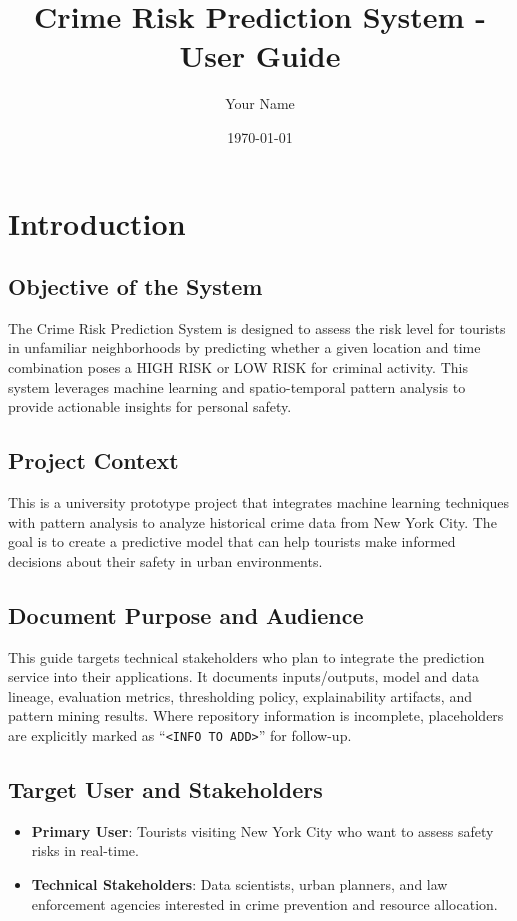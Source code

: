\documentclass{article}
\title{Crime Risk Prediction System - User Guide}
\author{Your Name}
\date{\today}
\begin{document}
\maketitle

\tableofcontents
\newpage

\section{Introduction}

\subsection{Objective of the System}
The Crime Risk Prediction System is designed to assess the risk level for tourists in unfamiliar neighborhoods by predicting whether a given location and time combination poses a HIGH RISK or LOW RISK for criminal activity. This system leverages machine learning and spatio-temporal pattern analysis to provide actionable insights for personal safety.

\subsection{Project Context}
This is a university prototype project that integrates machine learning techniques with pattern analysis to analyze historical crime data from New York City. The goal is to create a predictive model that can help tourists make informed decisions about their safety in urban environments.

\subsection{Document Purpose and Audience}
This guide targets technical stakeholders who plan to integrate the prediction service into their applications. It documents inputs/outputs, model and data lineage, evaluation metrics, thresholding policy, explainability artifacts, and pattern mining results. Where repository information is incomplete, placeholders are explicitly marked as ``\texttt{<INFO TO ADD>}'' for follow-up.

\subsection{Target User and Stakeholders}
\begin{itemize}
\item \textbf{Primary User}: Tourists visiting New York City who want to assess safety risks in real-time.
\item \textbf{Technical Stakeholders}: Data scientists, urban planners, and law enforcement agencies interested in crime prevention and resource allocation.
\end{itemize}
\end{document}
